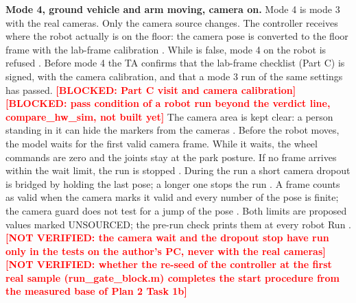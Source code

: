 \documentclass[11pt]{article}
\newcommand{\todo}[1]{\textcolor{red}{\textbf{[#1]}}}
\newcommand{\cmd}[1]{\texttt{\romecode{#1}}}
\newif\ifshowsrc
\newcommand{\src}[1]{\ifshowsrc{\scriptsize\,[\texttt{\romecode{#1}}]}\fi}
\begin{document}
\textbf{Mode 4, ground vehicle and arm moving, camera on.} Mode 4 is mode 3 with the real cameras. Only the camera
source changes. The controller receives where the robot actually is on the floor: the camera pose is converted to the
floor frame with the lab-frame calibration \cmd{motive_cal}
\src{lab_settings.m:39-43; Optitrack/motive_to_floor.m:34;Optitrack/motive_to_floor.m:39-40}. While
\cmd{motive_cal.measured} is false, mode 4 on the robot is refused \src{lab_settings.m:44-48}. Before mode 4 the TA
confirms that the lab-frame checklist (Part C) is signed, with the camera calibration, and that a mode 3 run of the
same settings has passed.
\todo{BLOCKED: Part C visit and camera calibration}
\todo{BLOCKED: pass condition of a robot run beyond the verdict line, compare\_hw\_sim, not built yet}
The camera area is kept clear: a person standing in it can hide the markers from the cameras
\src{docs/lab/PART_I_RUN_PLAN.md:123}. Before the robot moves, the model waits for the first valid camera frame. While
it waits, the wheel commands are zero and the joints stay at the park posture. If no frame arrives within the wait
limit, the run is stopped
\src{camera_guard_core.m:24-25; camera_guard_core.m:36-39; run_gate_block.m:7-11; joint_gate_block.m:11-15}. During
the run a short camera dropout is bridged by holding the last pose; a longer one stops the run
\src{camera_guard_core.m:26-28; camera_guard_core.m:37-39}. A frame counts as valid when the camera marks it valid and
every number of the pose is finite; the camera guard does not test for a jump of the pose \src{camera_guard_core.m:16-19}. Both limits
are proposed values marked UNSOURCED; the pre-run check prints them at every robot Run
\src{allowed_ranges.m:141-147; prerun_check.m:95-96}.
\todo{NOT VERIFIED: the camera wait and the dropout stop have run only in the tests on the author's PC, never with the real cameras}
\todo{NOT VERIFIED: whether the re-seed of the controller at the first real sample (run\_gate\_block.m) completes the start procedure from the measured base of Plan 2 Task 1b}
\end{document}

